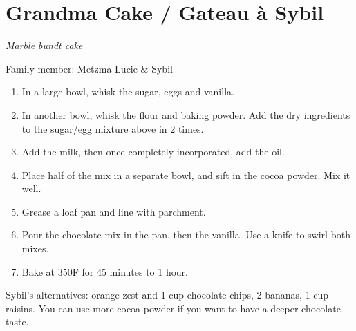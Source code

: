 \chapter{Grandma Cake / Gateau à Sybil}
\label{ch:grandma_cake}


\textit{Marble bundt cake}

Family member: Metzma Lucie \& Sybil

\begin{enumerate}
    \item In a large bowl, whisk the sugar, eggs and vanilla.
    \item In another bowl, whisk the flour and baking powder. Add the dry ingredients to the sugar/egg mixture above in 2 times.
    \item Add the milk, then once completely incorporated, add the oil.
    \item Place half of the mix in a separate bowl, and sift in the cocoa powder. Mix it well.
    \item Grease a loaf pan and line with parchment. 
    \item Pour the chocolate mix in the pan, then the vanilla. Use a knife to swirl both mixes.
    \item Bake at 350\degree F for 45 minutes to 1 hour.
\end{enumerate}

%


Sybil’s alternatives: orange zest and 1 cup chocolate chips, 2 bananas, 1 cup raisins. You can use more cocoa powder if you want to have a deeper chocolate taste.

